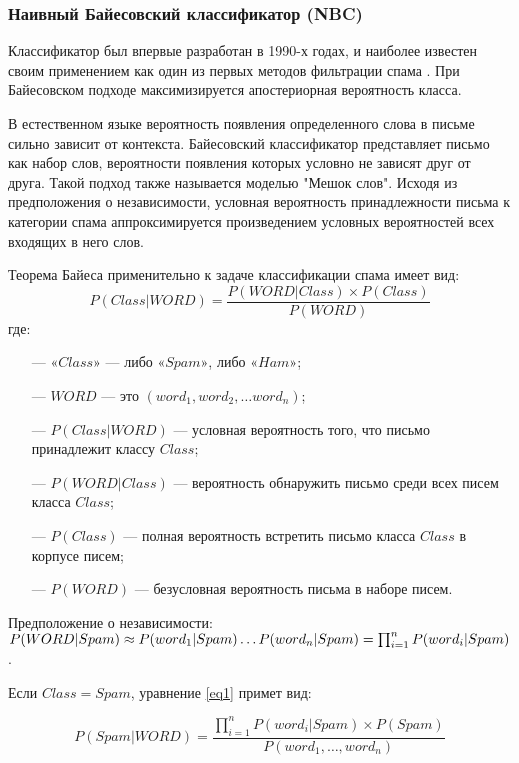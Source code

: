 \subsubsection{Наивный Байесовский классификатор (NBC)}
Классификатор был впервые разработан в 1990-х годах, и наиболее известен
своим применением как один из первых методов фильтрации спама \cite{Bayes}.
При Байесовском подходе максимизируется апостериорная вероятность класса.

В естественном языке вероятность появления определенного слова в письме
сильно зависит от контекста. Байесовский классификатор представляет письмо
как набор слов, вероятности появления которых условно не зависят друг от друга.
Такой подход также называется моделью "Мешок слов".
Исходя из предположения о независимости, условная вероятность принадлежности
письма к категории спама аппроксимируется произведением условных
вероятностей всех входящих в него слов.

Теорема Байеса применительно к задаче классификации спама имеет вид:
\begin{equation}\label{eq1}
    P(Class | WORD) = \frac{P(WORD | Class) \times P(Class)}{P(WORD)}
\end{equation}
где:
\begin{itemize}
    \item[—] ${«Class»}$ — либо ${«Spam»}$, либо ${«Ham»}$;
    \item[—] ${WORD}$ — это $({word_1}, {word_2}, \dots {word_n})$;
    \item[—] ${P(Class | WORD)}$ — условная вероятность того, что письмо принадлежит классу ${Class}$;
    \item[—] ${P(WORD | Class)}$ — вероятность обнаружить письмо среди всех писем класса ${Class}$;
    \item[—] ${P(Class)}$ — полная вероятность встретить письмо класса ${Class}$ в корпусе писем;
    \item[—] ${P(WORD)}$ — безусловная вероятность письма в наборе писем.
\end{itemize}

Предположение о независимости:
$P(WORD | Spam) \approx P(word_1 | Spam) \dots \\ P(word_n | Spam) = \prod_{i=1}^n P(word_i | Spam)$.

Если ${Class = Spam}$, уравнение \eqref{eq1} примет вид:


\begin{equation}\label{eq3}
    P(Spam | WORD) = \frac {\prod_{i=1}^n P(word_i | Spam) \times P(Spam)} {P(word_1, \dots ,word_n)}
\end{equation}


